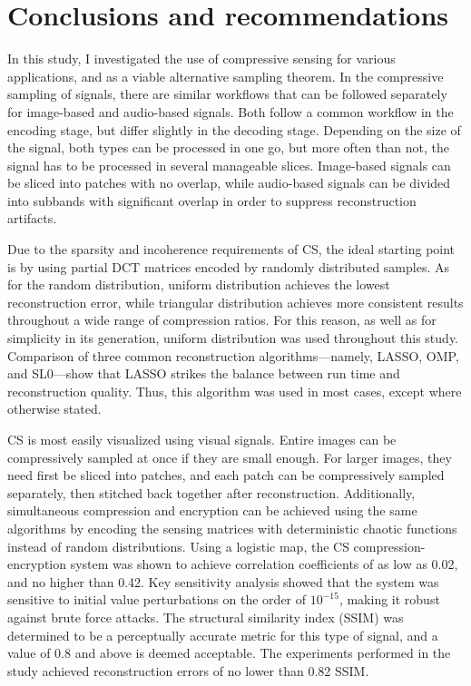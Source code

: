 \chapter{Conclusions and recommendations}
\label{chap:conc}


In this study, I investigated the use of compressive sensing for various applications, and as a viable alternative sampling theorem. In the compressive sampling of signals, there are similar workflows that can be followed separately for image-based and audio-based signals. Both follow a common workflow in the encoding stage, but differ slightly in the decoding stage. Depending on the size of the signal, both types can be processed in one go, but more often than not, the signal has to be processed in several manageable slices. Image-based signals can be sliced into patches with no overlap, while audio-based signals can be divided into subbands with significant overlap in order to suppress reconstruction artifacts.

Due to the sparsity and incoherence requirements of CS, the ideal starting point is by using partial DCT matrices encoded by randomly distributed samples. As for the random distribution, uniform distribution achieves the lowest reconstruction error, while triangular distribution achieves more consistent results throughout a wide range of compression ratios. For this reason, as well as for simplicity in its generation, uniform distribution was used throughout this study. Comparison of three common reconstruction algorithms---namely, LASSO, OMP, and SL0---show that LASSO strikes the balance between run time and reconstruction quality. Thus, this algorithm was used in most cases, except where otherwise stated.

CS is most easily visualized using visual signals. Entire images can be compressively sampled at once if they are small enough. For larger images, they need first be sliced into patches, and each patch can be compressively sampled separately, then stitched back together after reconstruction. Additionally, simultaneous compression and encryption can be achieved using the same algorithms by encoding the sensing matrices with deterministic chaotic functions instead of random distributions. Using a logistic map, the CS compression-encryption system was shown to achieve correlation coefficients of as low as 0.02, and no higher than 0.42. Key sensitivity analysis showed that the system was sensitive to initial value perturbations on the order of $10^{-15}$, making it robust against brute force attacks. The structural similarity index (SSIM) was determined to be a perceptually accurate metric for this type of signal, and a value of 0.8 and above is deemed acceptable. The experiments performed in the study achieved reconstruction errors of no lower than 0.82 SSIM.

